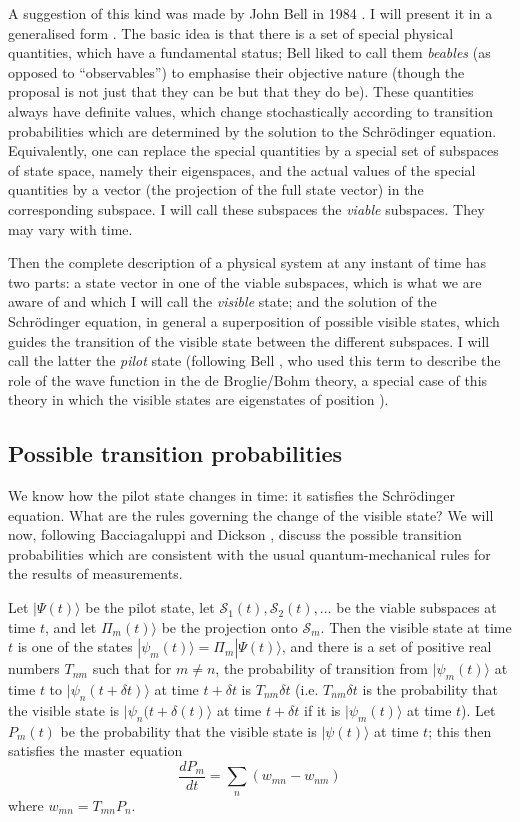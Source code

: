 \documentclass[12pt,a4paper,reqno]{article}
\renewcommand{\(}{\left(}
\renewcommand{\)}{\right)}
\renewcommand{\S}{\mathcal{S}}
\newcommand{\<}{\langle}
\renewcommand{\>}{\rangle}
\theoremstyle{plain} %
\theoremstyle{definition}
\theoremstyle{remark}
\begin{document}
A suggestion of this kind was made by John Bell in 1984 \cite{Bell:beables}.
I will present it in a generalised form \cite{QMPN, determlimit,
Bub:book}. The basic idea is that there is a set of special physical
quantities, which have a fundamental status; Bell liked to call them
\emph{beables} (as opposed to ``observables'') to emphasise their
objective nature (though the proposal is not just that they can be but
that they do be). These quantities always have definite
values, which change stochastically according to transition
probabilities which are determined by the solution to the Schr\"odinger
equation. Equivalently, one can replace the special quantities by a special set of
subspaces of state space, namely their eigenspaces, and the actual values of the
special quantities by a vector (the projection of the full state vector)
in the corresponding subspace. I will call these subspaces the
\emph{viable} subspaces. They may vary with time.

Then the complete description of a physical system at any
instant of time has two parts: a state vector in one of the viable subspaces, 
which is what we are aware of and which I will call the {\em visible} 
state; and the solution of the Schr\"odinger equation, in general a superposition 
of possible visible states, which guides the transition of the visible
state between the different subspaces. I will call the latter the {\em pilot} state
(following Bell \cite{Bell:pilot}, who used this term to describe the role of the wave
function in the de Broglie/Bohm theory, a special case of this theory in which 
the visible states are eigenstates of position \cite{determlimit}).

\subsection{Possible transition probabilities}

We know how the pilot state changes in time: it satisfies the
Schr\"odinger equation. What are the rules governing the change of the
visible state? We will now, following Bacciagaluppi and Dickson
\cite{BacciaDickson}, discuss the possible transition probabilities
which are consistent with the usual quantum-mechanical rules for the
results of measurements. 

Let $|\Psi(t)\>$ be the pilot state, let $\S_1(t), \S_2(t),
\ldots$ be the viable subspaces at time $t$, and let 
$\Pi_m(t)\>$ be the projection onto $\S_m$. Then the visible state at
time $t$ is one of the states $|\psi_m(t)\>=\Pi_m|\Psi(t)\>$,
and there is a set of positive real numbers $T_{nm}$ such that for 
$m \ne n$, the probability of transition from $|\psi_m(t)\>$ at time $t$
to $|\psi_n(t+\delta t)\>$ at time $t + \delta t$ is $T_{nm}\delta t$
(i.e. $T_{nm}\delta t$ is the probability that the visible state is
$|\psi_n(t+\delta (t)\>$ at time $t + \delta t$ if it is $|\psi_m(t)\>$ 
at time $t$). Let $P_m(t)$ be the probability that the visible state is
$|\psi(t)\>$ at time $t$; this then satisfies the master equation
\begin{equation}\label{master}
\frac{dP_m}{dt} = \sum_n(w_{mn} - w_{nm})
\end{equation}
where $w_{mn} = T_{mn}P_n$.
\end{document}
